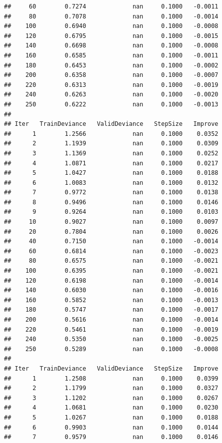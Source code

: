 \documentclass[
]{book}
\begin{document}
\begin{verbatim}
##     60        0.7274             nan     0.1000   -0.0011
##     80        0.7078             nan     0.1000   -0.0014
##    100        0.6940             nan     0.1000   -0.0008
##    120        0.6795             nan     0.1000   -0.0015
##    140        0.6698             nan     0.1000   -0.0008
##    160        0.6585             nan     0.1000   -0.0011
##    180        0.6453             nan     0.1000   -0.0002
##    200        0.6358             nan     0.1000   -0.0007
##    220        0.6313             nan     0.1000   -0.0019
##    240        0.6263             nan     0.1000   -0.0020
##    250        0.6222             nan     0.1000   -0.0013
## 
## Iter   TrainDeviance   ValidDeviance   StepSize   Improve
##      1        1.2566             nan     0.1000    0.0352
##      2        1.1939             nan     0.1000    0.0309
##      3        1.1369             nan     0.1000    0.0252
##      4        1.0871             nan     0.1000    0.0217
##      5        1.0427             nan     0.1000    0.0188
##      6        1.0083             nan     0.1000    0.0132
##      7        0.9772             nan     0.1000    0.0138
##      8        0.9496             nan     0.1000    0.0146
##      9        0.9264             nan     0.1000    0.0103
##     10        0.9027             nan     0.1000    0.0097
##     20        0.7804             nan     0.1000    0.0026
##     40        0.7150             nan     0.1000   -0.0014
##     60        0.6814             nan     0.1000   -0.0023
##     80        0.6575             nan     0.1000   -0.0021
##    100        0.6395             nan     0.1000   -0.0021
##    120        0.6198             nan     0.1000   -0.0014
##    140        0.6030             nan     0.1000   -0.0016
##    160        0.5852             nan     0.1000   -0.0013
##    180        0.5747             nan     0.1000   -0.0017
##    200        0.5616             nan     0.1000   -0.0014
##    220        0.5461             nan     0.1000   -0.0019
##    240        0.5350             nan     0.1000   -0.0025
##    250        0.5289             nan     0.1000   -0.0008
## 
## Iter   TrainDeviance   ValidDeviance   StepSize   Improve
##      1        1.2508             nan     0.1000    0.0399
##      2        1.1799             nan     0.1000    0.0327
##      3        1.1202             nan     0.1000    0.0267
##      4        1.0681             nan     0.1000    0.0230
##      5        1.0267             nan     0.1000    0.0188
##      6        0.9903             nan     0.1000    0.0144
##      7        0.9579             nan     0.1000    0.0146

\end{verbatim}
\end{document}
